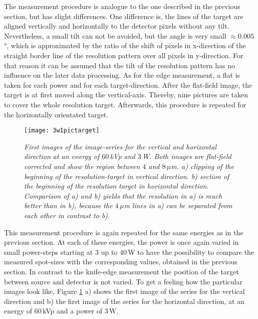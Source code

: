 
The measurement procedure is analogue to the one described in the previous section, but has slight differences. One difference is, the lines of the target are aligned vertically and horizontally to the detector pixels without any tilt. Nevertheless, a small tilt can not be avoided, but the angle is very small $\approx 0.005$°, which is approximated by the ratio of the shift of pixels in x-direction of the straight border line of the resolution pattern over all pixels in y-direction. For that reason it can be assumed that the tilt of the resolution pattern has no influence on the later data processing. As for the edge measurement, a \gls{flat} is taken for each power and for each target-direction. After the flat-field image, the target is at first moved along the vertical-axis. Thereby, nine pictures are taken to cover the whole resolution target. Afterwards, this procedure is repeated for the horizontally orientated target. 

\begin{figure}[h]
	\begin{center}
		\texttt{[image: 3w1pictarget]}
	\end{center}
	\caption[First image of the resolution-target at $60\,$kVp and $3\,$W in vertical and horizontal direction, respectively.]{\textit{First images of the image-series for the vertical and horizontal direction at an energy of $60\,$kVp and $3\,$W. Both images are flat-field corrected and show the region between $4$ and $8\, \mu$m. a) clipping of the beginning of the resolution-target in vertical direction. b) section of the beginning of the resolution target in horizontal direction. Comparison of a) and b) yields that the resolution in a) is much better than in b), because the $4\, \mu$m lines in a) can be separated from each other in contrast to b).}}
	\label{restarget1pic}
\end{figure}
\clearpage
This measurement procedure is again repeated for the same energies as in the previous section. At each of these energies, the power is once again varied in small power-steps starting at $3$ up to $40\,$W to have the possibility to compare the measured spot-sizes with the corresponding values, obtained in the previous section. In contrast to the knife-edge measurement the position of the target between source and detector is not varied. To get a feeling how the particular images look like, Figure \ref{restarget1pic} a) shows the first image of the series for the vertical direction and b) the first image of the series for the horizontal direction, at an energy of $60\,$kVp and a power of $3\,$W. 
